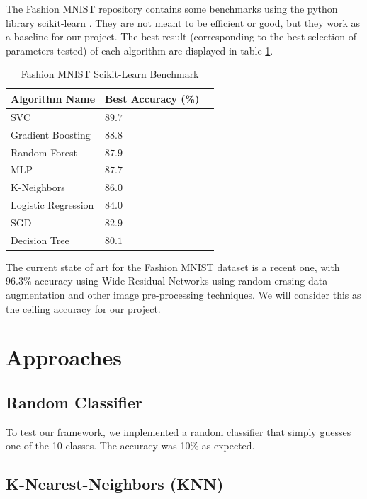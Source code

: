 \documentclass[twoside,twocolumn]{article}
\begin{document}
The Fashion MNIST repository contains some benchmarks using the python library
scikit-learn \cite{scikitlearnbenchmark}. They are not meant
to be efficient or good, but they work as a baseline for our project.
The best result (corresponding to the best selection of parameters tested)
of each algorithm are displayed in table \ref{table:scikit-benchmark}.

\begin{table}
\centering
\begin{tabular}{llr}
\toprule
Algorithm Name & Best Accuracy (\%) \\
\midrule
SVC & $89.7$ \\
Gradient Boosting & $88.8$ \\
Random Forest & $87.9$ \\
MLP & $87.7$ \\
K-Neighbors & $86.0$ \\
Logistic Regression & $84.0$ \\
SGD & $82.9$ \\
Decision Tree & $80.1$ \\
\bottomrule
\end{tabular}
\caption{Fashion MNIST Scikit-Learn Benchmark \cite{scikitlearnbenchmark} }
\label{table:scikit-benchmark}
\end{table}

The current state of art for the Fashion MNIST dataset is a recent one, with 96.3\% accuracy using Wide
Residual Networks using random erasing data augmentation \cite{randomerasingdataaugmentationpaper} and other image pre-processing techniques.
We will consider this as the ceiling accuracy for our project.


\section{Approaches}

\subsection{Random Classifier}

To test our framework, we implemented a random classifier that simply guesses one of the 10 classes. The accuracy was 10\% as expected.

\subsection{K-Nearest-Neighbors (KNN)}
\end{document}
